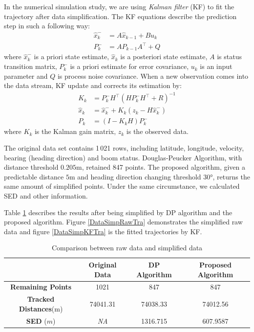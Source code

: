 In the numerical simulation study, we are using \textit{Kalman filter} (KF) to fit the trajectory after data simplification. The KF equations describe the prediction step in such a following way: 
\begin{align*}
\hat{x}_k^-&=A\hat{x}_{k-1}+Bu_k \\
P_k^-&=AP_{k-1}A^\top+Q
\end{align*}
where $\hat{x}_k^-$ is a priori state estimate, $\hat{x}_k$ is a posteriori state estimate, $A$ is status transition matrix, $P_k^-$ is a priori estimate for error covariance, $u_k$ is an input parameter and $Q$ is process noise covariance. When a new observation comes into the data stream, KF update and corrects its estimation by: 
\begin{align*}
K_k&=P_k^-H^\top \left(HP_k^-H^\top+R\right)^{-1} \\
\hat{x}_k&=\hat{x}_k^-+K_k\left(z_k-H\hat{x}_k^-\right) \\
P_k&=(I-K_kH)P_k^-
\end{align*}
where $K_k$ is the Kalman gain matrix, $z_k$ is the observed data.


The original data set contains 1\,021 rows, including latitude, longitude, velocity, bearing (heading direction) and boom status. Douglas-Peucker Algorithm, with distance threshold $0.205$m, retained 847 points. The proposed algorithm, given a predictable distance $5$m and heading direction changing threshold $\ang{30}$, returns the same amount of simplified points. Under the same circumstance, we calculated SED and other information. 

Table \ref{DataSimpCompTable} describes the results after being simplified by DP algorithm and the proposed algorithm. Figure \ref{DataSimpRawTra} demonstrates the simplified raw data and figure \ref{DataSimpKFTra} is the fitted trajectories by KF. 

\begin{table}
\centering
\caption{Comparison between raw data and simplified data}
\label{DataSimpCompTable}\footnotesize
\begin{tabular}{|c|c|c|c|}
\hline 
  & \textbf{Original Data} & \textbf{DP Algorithm} & \textbf{Proposed Algorithm}  \\
\hline 
\textbf{Remaining Points} & 1021   & 847   & 847 \\
\hline 
\textbf{Tracked Distances}(m)  & 74041.31     & 74038.33    & 74012.56     \\
\hline 
\textbf{SED} ($m$)    & \textit{NA}    & 1316.715    & 607.9587   \\
\hline 
\end{tabular}
\end{table}
\normalsize

